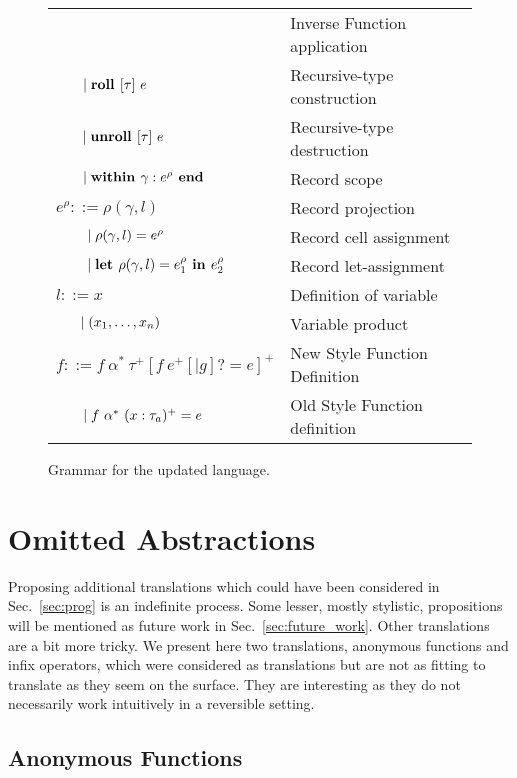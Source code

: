 \begin{figure}[ht!]
\begin{tabular}{p{}p{}}
    & Inverse Function application\\
$\hspace{1.9em}\mid \textbf{roll } [\tau]\ e$
    & Recursive-type construction \\
$\hspace{1.9em}\mid \textbf{unroll } [\tau]\ e$
    & Recursive-type destruction \\
$\hspace{1.9em}\mid \textbf{within } \gamma : e^\rho \textbf{ end}$
    & Record scope\\
$e^\rho ::= \rho(\gamma, l)$
    & Record projection \\
$\hspace{2.2em}\mid \rho(\gamma, l) = e^\rho$
    & Record cell assignment \\
$\hspace{2.2em}\mid \textbf{let } \rho(\gamma, l) = e^\rho_1 \textbf{ in } e^\rho_2$
    & Record let-assignment \\
$l ::= x$
    & Definition of variable\\
$\hspace{1.7em}\mid (x_1, \dots, x_n)$
    & Variable product\\
$f ::= f~\alpha^*~\tau^+ [f\ e^+ [\mid g]? = e]^+$
    & New Style Function Definition\\
$\hspace{1.9em}\mid f~\alpha^*~(x:\tau_a)^+ = e$
    & Old Style Function definition
\end{tabular}

\caption{Grammar for the updated language.}\label{fig:updated_grammar}
\end{figure}

\section{Omitted Abstractions}

Proposing additional translations  which could have been considered in
Sec.~\ref{sec:prog} is an indefinite process. Some lesser, mostly stylistic,
propositions will be mentioned as future work in Sec.~\ref{sec:future_work}.
Other translations are a bit more tricky. We present here two translations,
anonymous functions and infix operators, which were considered as translations
but are not as fitting to translate as they seem on the surface. They are
interesting as they do not necessarily work intuitively in a reversible
setting.

\subsection{Anonymous Functions}

